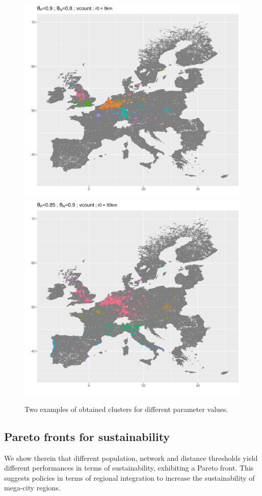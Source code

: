 \documentclass{jimis-en}
\begin{document}




\begin{figure}[ht] 
  {\includegraphics[width=0.49\linewidth]{figures/totalPop2219780_36719597_vcount378_radius8000.png}}
  {\includegraphics[width=0.49\linewidth]{figures/totalPop1474347_36891685_vcount595_radius50000.png}}
  \centering
  \label{fig:exclusters}
  \caption{Two examples of obtained clusters for different parameter values.}
\end{figure}





\subsection{Pareto fronts for sustainability}


We show therein that different population, network and distance thresholds yield different performances in terms of sustainability, exhibiting a Pareto front. This suggests policies in terms of regional integration to increase the sustainability of mega-city regions.
\end{document}
